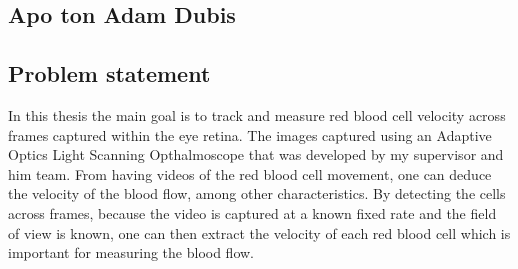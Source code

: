 \documentclass[]{article}
\begin{document}
\subsection{Apo ton Adam Dubis}


\subsection{Problem statement}
In this thesis the main goal is to track and measure red blood cell velocity across frames captured within the eye retina.	
The images captured using an Adaptive Optics Light Scanning Opthalmoscope that was developed by my supervisor and him team.
From having videos of the red blood cell movement, one can deduce the velocity of the blood flow, among other characteristics.
By detecting the cells across frames, because the video is captured at a known fixed rate and the field of view is known, one can then extract the velocity of each red blood cell which is important for measuring the blood flow.
\end{document}
